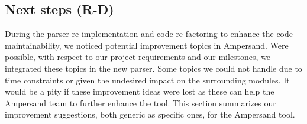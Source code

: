 
\subsection{Next steps (R-D)}
\label{subsec:design-next-steps}

During the parser re-implementation and code re-factoring to enhance the code maintainability, we noticed potential improvement topics in Ampersand.
Were possible, with respect to our project requirements and our milestones, we integrated these topics in the new parser.
Some topics we could not handle due to time constraints or given the undesired impact on the surrounding modules.
It would be a pity if these improvement ideas were lost as these can help the Ampersand team to further enhance the tool.
This section summarizes our improvement suggestions, both generic as specific ones, for the Ampersand tool.


